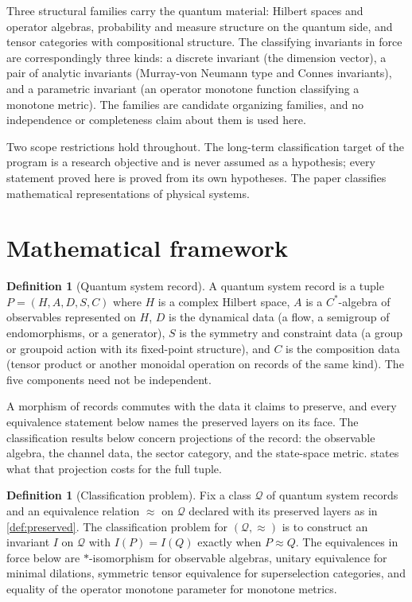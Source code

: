 \documentclass[11pt,letterpaper]{article}
\theoremstyle{definition}
\newtheorem{definition}[theorem]{Definition}
\theoremstyle{remark}
\begin{document}
Three structural families carry the quantum material: Hilbert spaces and operator algebras, probability and measure structure on the quantum side, and tensor categories with compositional structure. The classifying invariants in force are correspondingly three kinds: a discrete invariant (the dimension vector), a pair of analytic invariants (Murray-von Neumann type and Connes invariants), and a parametric invariant (an operator monotone function classifying a monotone metric). The families are candidate organizing families, and no independence or completeness claim about them is used here.

Two scope restrictions hold throughout. The long-term classification target of the program is a research objective and is never assumed as a hypothesis; every statement proved here is proved from its own hypotheses. The paper classifies mathematical representations of physical systems.

\section{Mathematical framework}

\begin{definition}[Quantum system record]
\label{def:system}
A quantum system record is a tuple $P = (H, A, D, S, C)$ where $H$ is a complex Hilbert space, $A$ is a $C^*$-algebra of observables represented on $H$, $D$ is the dynamical data (a flow, a semigroup of endomorphisms, or a generator), $S$ is the symmetry and constraint data (a group or groupoid action with its fixed-point structure), and $C$ is the composition data (tensor product or another monoidal operation on records of the same kind). The five components need not be independent.
\end{definition}

A morphism of records commutes with the data it claims to preserve, and every equivalence statement below names the preserved layers on its face. The classification results below concern projections of the record: the observable algebra, the channel data, the sector category, and the state-space metric.  states what that projection costs for the full tuple.

\begin{definition}[Classification problem]
\label{def:classproblem}
Fix a class $\mathcal{Q}$ of quantum system records and an equivalence relation $\approx$ on $\mathcal{Q}$ declared with its preserved layers as in \cref{def:preserved}. The classification problem for $(\mathcal{Q}, \approx)$ is to construct an invariant $I$ on $\mathcal{Q}$ with $I(P) = I(Q)$ exactly when $P \approx Q$. The equivalences in force below are $*$-isomorphism for observable algebras, unitary equivalence for minimal dilations, symmetric tensor equivalence for superselection categories, and equality of the operator monotone parameter for monotone metrics.
\end{definition}
\end{document}
